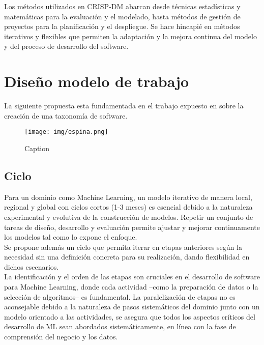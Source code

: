 \documentclass[journal]{IEEEtran}
\begin{document}
Los métodos utilizados en CRISP-DM abarcan desde técnicas estadísticas y matemáticas para la evaluación y el modelado, hasta métodos de gestión de proyectos para la planificación y el despliegue. Se hace hincapié en métodos iterativos y flexibles que permiten la adaptación y la mejora continua del modelo y del proceso de desarrollo del software.\\

\section{Diseño modelo de trabajo}

La siguiente propuesta esta fundamentada en el trabajo expuesto en \cite{Cret2013} sobre la creación de una taxonomía de software.

\begin{figure}[h!]
    \centering
    \texttt{[image: img/espina.png]}
    \caption{Caption}
    \label{fig:espina}
\end{figure}

\subsection{Ciclo}

Para un dominio como Machine Learning, un modelo iterativo de manera local, regional y global con ciclos cortos (1-3 meses) es esencial debido a la naturaleza experimental y evolutiva de la construcción de modelos. Repetir un conjunto de tareas de diseño, desarrollo y evaluación permite ajustar y mejorar continuamente los modelos tal como lo expone el enfoque.\\

Se propone además un ciclo que permita iterar en etapas anteriores según la necesidad sin una definición concreta para su realización, dando flexibilidad en dichos escenarios.\\

La identificación y el orden de las etapas son cruciales en el desarrollo de software para Machine Learning, donde cada actividad --como la preparación de datos o la selección de algoritmos-- es fundamental. La paralelización de etapas no es aconsejable debido a la naturaleza de pasos sistemáticos del dominio junto con un modelo orientado a las actividades, se asegura que todos los aspectos críticos del desarrollo de ML sean abordados sistemáticamente, en línea con la fase de comprensión del negocio y los datos.\\
\end{document}
